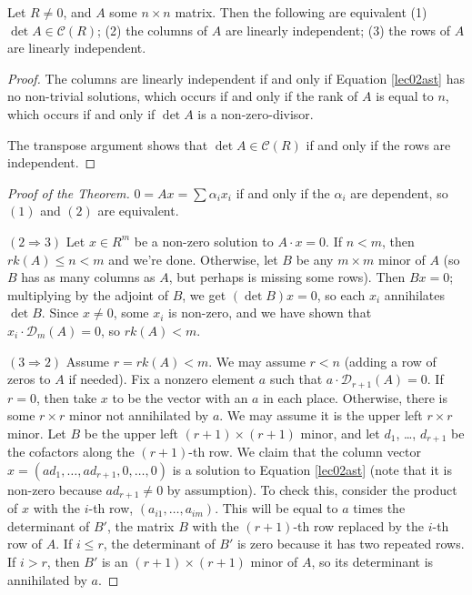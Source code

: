  \begin{corollary}
   Let $R\ne 0$, and $A$ some $n\times n$ matrix. Then the following are equivalent
   (1) $\det A\in \mathcal{C}(R)$; (2) the columns of $A$ are linearly independent; (3) the rows of
   $A$ are linearly independent.
 \end{corollary}
 \begin{proof}
   The columns are linearly independent if and only if Equation \ref{lec02ast} has no
   non-trivial solutions, which occurs if and only if the rank of $A$ is equal to $n$,
   which occurs if and only if $\det A$ is a non-zero-divisor.

   The transpose argument shows that $\det A\in \mathcal{C}(R)$ if and only if the rows are
   independent.
 \end{proof}
 \begin{proof}[Proof of the Theorem]
   $0=Ax = \sum \alpha_i x_i$ if and only if the $\alpha_i$ are dependent, so $(1)$ and
   $(2)$ are equivalent.

   $(2\Rightarrow 3)$ Let $x\in R^m$ be a non-zero solution to $A\cdot x=0$. If $n<m$,
   then $rk(A)\le n <m$ and we're done. Otherwise, let $B$ be any $m\times m$ minor of
   $A$ (so $B$ has as many columns as $A$, but perhaps is missing some rows). Then
   $Bx=0$; multiplying by the adjoint of $B$, we get $(\det B)x=0$, so each $x_i$
   annihilates $\det B$. Since $x\neq 0$, some $x_i$ is non-zero, and we have shown that
   $x_i\cdot \mathcal{D}_m(A)=0$, so $rk(A)<m$.

   $(3\Rightarrow 2)$ Assume $r=rk(A)<m$. We may assume $r< n$ (adding a row of
   zeros to $A$ if needed). Fix a nonzero element $a$ such that $a\cdot \mathcal{D}_{r+1}(A)=0$.
   If $r=0$, then take $x$ to be the vector with an $a$ in each place. Otherwise, there
   is some $r\times r$ minor not annihilated by $a$. We may assume it is the upper left
   $r\times r$ minor. Let $B$ be the upper left $(r+1)\times (r+1)$ minor, and let $d_1$,
   \dots, $d_{r+1}$ be the cofactors along the $(r+1)$-th row. We claim that the column
   vector $x = (ad_1,\dots, ad_{r+1},0,\dots, 0)$ is a solution to Equation
   \ref{lec02ast} (note that it is non-zero because $ad_{r+1}\neq 0$ by assumption). To
   check this, consider the product of $x$ with the $i$-th row, $(a_{i1},\dots, a_{im})$.
   This will be equal to $a$ times the determinant of $B'$, the matrix $B$ with the
   $(r+1)$-th row replaced by the $i$-th row of $A$. If $i\le r$, the determinant of $B'$
   is zero because it has two repeated rows. If $i> r$, then $B'$ is an $(r+1)\times
   (r+1)$ minor of $A$, so its determinant is annihilated by $a$.
 \end{proof}
